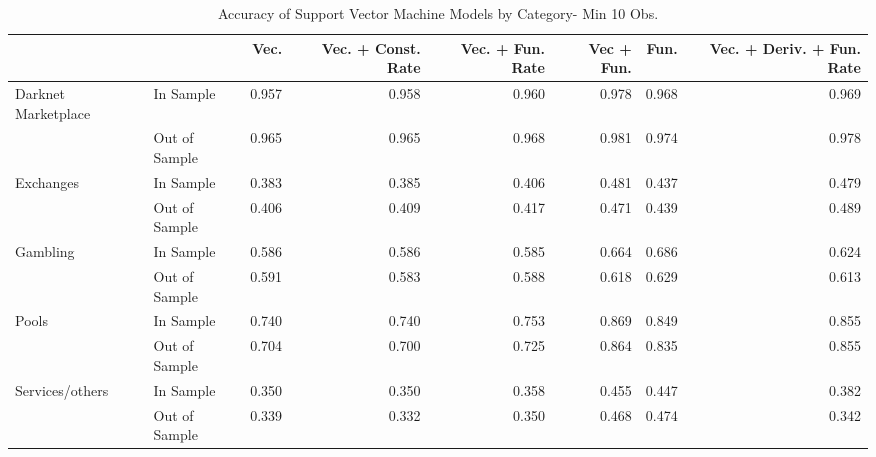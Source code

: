 \begin{table}[ht]
\centering
\begin{tabular}{llrrrrrr}
  \hline
 &  & Vec. & Vec. + Const. Rate & Vec. + Fun. Rate & Vec + Fun. & Fun. & Vec. + Deriv. + Fun. Rate \\ 
  \hline
Darknet Marketplace & In Sample & 0.957 & 0.958 & 0.960 & 0.978 & 0.968 & 0.969 \\ 
   & Out of Sample & 0.965 & 0.965 & 0.968 & 0.981 & 0.974 & 0.978 \\ 
  Exchanges & In Sample & 0.383 & 0.385 & 0.406 & 0.481 & 0.437 & 0.479 \\ 
   & Out of Sample & 0.406 & 0.409 & 0.417 & 0.471 & 0.439 & 0.489 \\ 
  Gambling & In Sample & 0.586 & 0.586 & 0.585 & 0.664 & 0.686 & 0.624 \\ 
   & Out of Sample & 0.591 & 0.583 & 0.588 & 0.618 & 0.629 & 0.613 \\ 
  Pools & In Sample & 0.740 & 0.740 & 0.753 & 0.869 & 0.849 & 0.855 \\ 
   & Out of Sample & 0.704 & 0.700 & 0.725 & 0.864 & 0.835 & 0.855 \\ 
  Services/others & In Sample & 0.350 & 0.350 & 0.358 & 0.455 & 0.447 & 0.382 \\ 
   & Out of Sample & 0.339 & 0.332 & 0.350 & 0.468 & 0.474 & 0.342 \\ 
   \hline
\end{tabular}
\caption{Accuracy of Support Vector Machine Models by Category- Min 10 Obs.} 
\label{svm_10obs_acc_cat}
\end{table}
